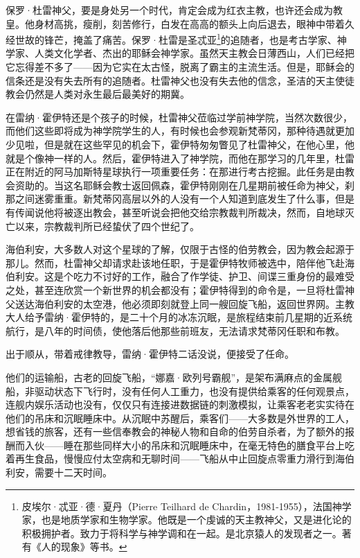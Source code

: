 \documentclass[AutoFakeBold=true]{book}
\begin{document}
保罗·杜雷神父，要是身处另一个时代，肯定会成为红衣主教，也许还会成为教皇。他身材高挑，瘦削，刻苦修行，白发在高高的额头上向后退去，眼神中带着久经世故的锋芒，掩盖了痛苦。保罗·杜雷是圣忒亚\footnote{皮埃尔·忒亚·德·夏丹（Pierre Teilhard de Chardin，1981-1955），法国神学家，也是地质学家和生物学家。他既是一个虔诚的天主教神父，又是进化论的积极拥护者。致力于将科学与神学调和在一起。是北京猿人的发现者之一。著有《人的现象》等书。}的追随者，也是考古学家、神学家、人类文化学者、杰出的耶稣会神学家。虽然天主教会日薄西山，人们已经把它忘得差不多了——因为它实在太古怪，脱离了霸主的主流生活。但是，耶稣会的信条还是没有失去所有的追随者。杜雷神父也没有失去他的信念，圣洁的天主使徒教会仍然是人类对永生最后最美好的期冀。

在雷纳·霍伊特还是个孩子的时候，杜雷神父莅临过学前神学院，当然次数很少，而他们这些即将成为神学院学生的人，有时候也会参观新梵蒂冈，那种待遇就更加少见啦，但是就在这些罕见的机会下，霍伊特匆匆瞥见了杜雷神父，在他心里，他就是个像神一样的人。然后，霍伊特进入了神学院，而他在那学习的几年里，杜雷正在附近的阿马加斯特星球执行一项重要任务：在那进行考古挖掘。此任务是由教会资助的。当这名耶稣会教士返回佩森，霍伊特刚刚在几星期前被任命为神父，刹那之间迷雾重重。新梵蒂冈高层以外的人没有一个人知道到底发生了什么事，但是有传闻说他将被逐出教会，甚至听说会把他交给宗教裁判所裁决，然而，自地球灭亡以来，宗教裁判所已经蛰伏了四个世纪了。

海伯利安，大多数人对这个星球的了解，仅限于古怪的伯劳教会，因为教会起源于那儿。然而，杜雷神父却请求赴该地任职，于是霍伊特牧师被选中，陪伴他飞赴海伯利安。这是个吃力不讨好的工作，融合了作学徒、护卫、间谍三重身份的最难受之处，甚至连欣赏一个新世界的机会都没有；霍伊特得到的命令是，一旦将杜雷神父送达海伯利安的太空港，他必须即刻就登上同一艘回旋飞船，返回世界网。主教大人给予雷纳·霍伊特的，是二十个月的冰冻沉眠，是旅程结束前几星期的近系统航行，是八年的时间债，使他落后他那些前班友，无法请求梵蒂冈任职和布教。

出于顺从，带着戒律教导，雷纳·霍伊特二话没说，便接受了任命。

他们的运输船，古老的回旋飞船，``娜嘉·欧列号霸舰''，是架布满麻点的金属舰船，非驱动状态下飞行时，没有任何人工重力，也没有提供给乘客的任何观景点，连舰内娱乐活动也没有，仅仅只有连接进数据链的刺激模拟，让乘客老老实实待在他们的吊床和沉眠睡床中。从沉眠中苏醒后，乘客们——大多数是外世界的工人，想省钱的旅客，还有一些信奉教会的神秘人物和自命的伯劳自杀者，为了额外的报酬而入伙——睡在那些同样大小的吊床和沉眠睡床中，在毫无特色的膳食平台上吃着再生食品，慢慢应付太空病和无聊时间——飞船从中止回旋点零重力滑行到海伯利安，需要十二天时间。
\end{document}
